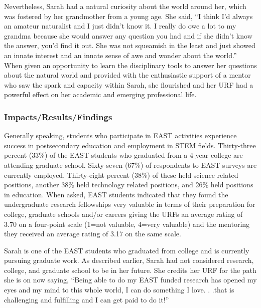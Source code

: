 \documentclass[11.5pt]{sig-alternate} %
\begin{document}
\begin{large}
Nevertheless, Sarah had a natural curiosity about the world around her, which was fostered by her grandmother from a young age. She said, “I think I'd always an amateur naturalist and I just didn't know it. I really do owe a lot to my grandma because she would answer any question you had and if she didn't know the answer, you'd find it out. She was not squeamish in the least and just showed an innate interest and an innate sense of awe and wonder about the world.” When given an opportunity to learn the disciplinary tools to answer her questions about the natural world and provided with the enthusiastic support of a mentor who saw the spark and capacity within Sarah, she flourished and her URF had a powerful effect on her academic and emerging professional life.

\subsubsection*{Impacts/Results/Findings}
Generally speaking, students who participate in EAST activities experience success in postsecondary education and employment in STEM fields. Thirty-three percent (33\%) of the EAST students who graduated from a 4-year college are attending graduate school. Sixty-seven (67\%) of respondents to EAST surveys are currently employed. Thirty-eight percent (38\%) of these held science related positions, another 38\% held technology related positions, and 26\% held positions in education. When asked, EAST students indicated that they found the undergraduate research fellowships very valuable in terms of their preparation for college, graduate schools and/or careers giving the URFs an average rating of 3.70 on a four-point scale (1=not valuable, 4=very valuable) and the mentoring they received an average rating of
3.17 on the same scale.

Sarah is one of the EAST students who graduated from college and is currently pursuing graduate work. As described earlier, Sarah had not considered research, college, and graduate school to be in her future. She credits her URF for the path she is on now saying, “Being able to do my EAST funded research has opened my eyes and my mind to this whole world, I can do something I love. . .that is challenging and fulfilling and I can get paid to do it!”


\end{large}
\end{document}
